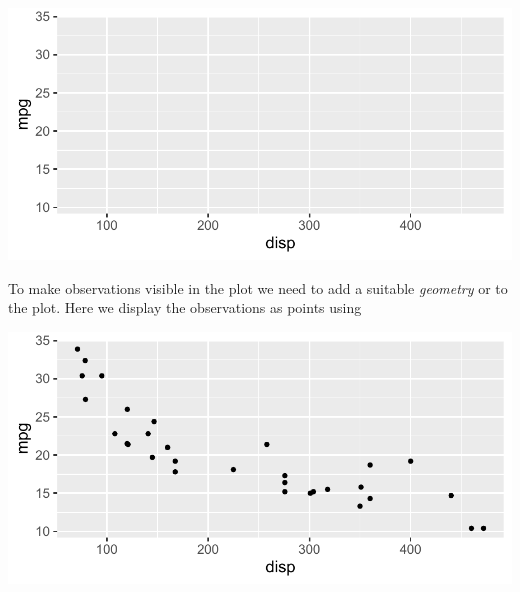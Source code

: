 \documentclass[krantz2]{krantz}\usepackage{knitr}
\begin{document}
\begin{knitrout}\footnotesize
{}\color{fgcolor}\begin{kframe}
\begin{alltt}
\hlstd{(} 
       \hlstd{(}   
\end{alltt}
\end{kframe}

{\centering \includegraphics[width=.7\textwidth]{figure/pos-ggplot-basics-03-1} 

}



\end{knitrout}

To make observations visible in the plot we need to add a suitable \emph{geometry} or  to the plot. Here we display the observations as points using 

\begin{knitrout}\footnotesize
{}\color{fgcolor}\begin{kframe}
\begin{alltt}
\hlstd{(} 
       \hlstd{(}    \hlopt{+}
  \hlstd{()}
\end{alltt}
\end{kframe}

{\centering \includegraphics[width=.7\textwidth]{figure/pos-ggplot-basics-04-1} 

}



\end{knitrout}
\end{document}
